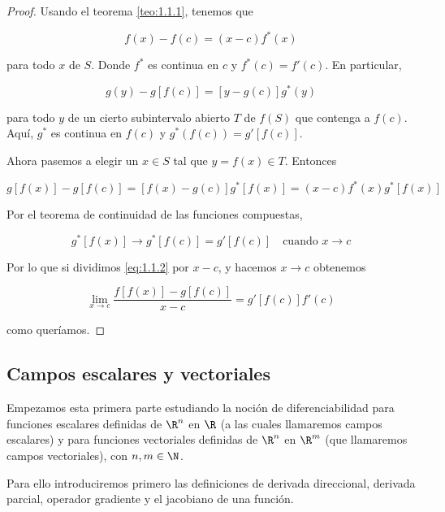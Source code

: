 \begin{proof}
    Usando el teorema \ref{teo:1.1.1}, tenemos que
    
    \[
    f(x) - f(c) = (x-c)f^*(x)
    \]
    
    \noindent para todo $x$ de $S$. Donde $f^*$ es continua en $c$ y $f^*(c) = f'(c)$. En particular,
    
    \[
    g(y) - g[f(c)] = [y - g(c)]g^*(y)
    \]
    
    \noindent para todo $y$ de un cierto subintervalo abierto $T$ de $f(S)$ que contenga a $f(c)$. Aquí, $g^*$ es continua en $f(c)$ y $g^*(f(c)) = g'[f(c)]$.
    
    Ahora pasemos a elegir un $x \in S$ tal que $y = f(x) \in T$. Entonces
    
    \begin{equation}\label{eq:1.1.2}
        g[f(x)] - g[f(c)] = [f(x) - g(c)]g^*[f(x)] = (x-c)f^*(x)g^*[f(x)]
    \end{equation}
    
    Por el teorema de continuidad de las funciones compuestas,
    
    \[
    g^*[f(x)] \rightarrow g^*[f(c)] = g'[f(c)] \quad \text{cuando $x \rightarrow c$}
    \]
    
    Por lo que si dividimos \ref{eq:1.1.2} por $x-c$, y hacemos $x \rightarrow c$ obtenemos
    
    \[
    \lim_{x \to c} \frac{f[f(x)] - g[f(c)]}{x-c} = g'[f(c)]f'(c)
    \]
    
    \noindent como queríamos.
\end{proof}

\subsection{Campos escalares y vectoriales}

Empezamos esta primera parte estudiando la noción de diferenciabilidad para funciones escalares definidas de $\R^n$ en $\R$ (a las cuales llamaremos campos escalares) y para funciones vectoriales definidas de $\R^n$ en $\R^m$ (que llamaremos campos vectoriales), con $n,m \in \N$.

Para ello introduciremos primero las definiciones de derivada direccional, derivada parcial, operador gradiente y el jacobiano de una función.

